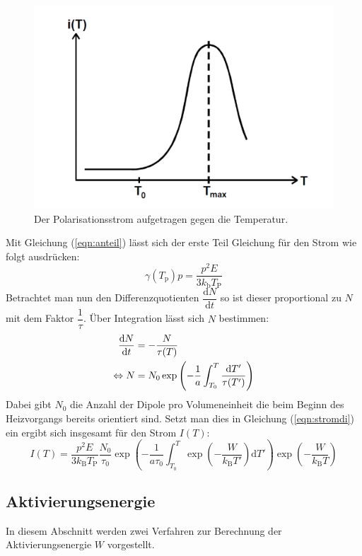 \begin{figure}[h!]
  \centering
  \includegraphics[scale=0.5]{fig/stromver.png}
  \caption{Der Polarisationsstrom aufgetragen gegen die Temperatur.}
  \label{fig:stromdi}
\end{figure}
Mit Gleichung (\ref{eqn:anteil}) lässt sich der erste Teil Gleichung für den Strom wie folgt ausdrücken:
\begin{equation}
  \label{eqn:stromdi2}
  \gamma(T_\mathrm{p})p=\dfrac{p^2E}{3 k_\mathrm{b} T_\mathrm{P}}
\end{equation}
Betrachtet man nun den Differenzquotienten $\dfrac{\mathrm{d} N}{\mathrm{d} t}$ so ist dieser proportional zu $N$ mit dem Faktor $\dfrac{1}{\tau}$. Über Integration lässt sich $N$ bestimmen:
\begin{align}
  \dfrac{\mathrm{d} N}{\mathrm{d} t}&=-\dfrac{N}{\tau(T)} \notag \\
  \label{eqn:einset}
  \Leftrightarrow N&=N_\mathrm{0}\exp\left(-\dfrac{1}{a}\int_{T_0}^T\dfrac{\mathrm{d} T'}{\tau(T')}\right)
\end{align}
Dabei gibt $N_\mathrm{0}$ die Anzahl der Dipole pro Volumeneinheit die beim Beginn des Heizvorgangs bereits orientiert sind. Setzt man dies in Gleichung (\ref{eqn:stromdi}) ein ergibt sich insgesamt für den Strom $I(T)$:
\begin{equation}
  \label{eqn:stromdi3}
  I(T) = \dfrac{p^2 E}{3k_\mathrm{B}T_\mathrm{P}}\dfrac{N_\mathrm{0}}{\tau_\mathrm{0}} \exp{\left(-\dfrac{1}{a\tau_\mathrm{0}}\int_{T_0}^T\exp{\left(-\dfrac{W}{k_\mathrm{B}T'}\right)\mathrm{d}T'}\right)}\exp{\left(-\dfrac{W}{ k_\mathrm{B}T}\right)}
\end{equation}
\subsection{Aktivierungsenergie}
\label{sec:akti}
In diesem Abschnitt werden zwei Verfahren zur Berechnung der Aktivierungsenergie $W$ vorgestellt.
